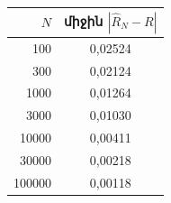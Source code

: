 \begin{tabular}{|r|c|}
\hline
$N$ & միջին $|\widehat R_N-R|$\\
\hline
100 & 0{,}02524\\
\hline
300 & 0{,}02124\\
\hline
1000 & 0{,}01264\\
\hline
3000 & 0{,}01030\\
\hline
10000 & 0{,}00411\\
\hline
30000 & 0{,}00218\\
\hline
100000 & 0{,}00118\\
\hline
\end{tabular}

